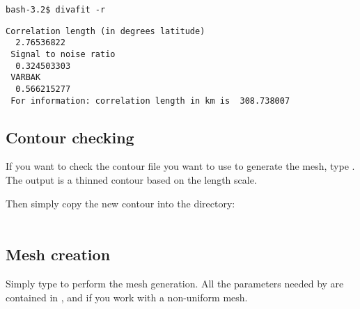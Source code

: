 \begin{lstlisting}[style=Bash]
bash-3.2$ divafit -r
\end{lstlisting}

\begin{exfile}[H]
\begin{footnotesize}
\begin{verbatim}
Correlation length (in degrees latitude)
  2.76536822
 Signal to noise ratio
  0.324503303
 VARBAK
  0.566215277
 For information: correlation length in km is  308.738007
\end{verbatim}
\end{footnotesize}
\caption{}
\end{exfile}



\subsection{Contour checking}

If you want to check the contour file you want to use to generate the mesh, type . The output  is a thinned contour based on the length scale.


Then simply copy the new contour into the  directory:\\
\\


\subsection{Mesh creation}

Simply type  to perform the mesh generation. All the parameters needed by \diva are contained in ,  and  if you work with a non-uniform mesh.
%
%


